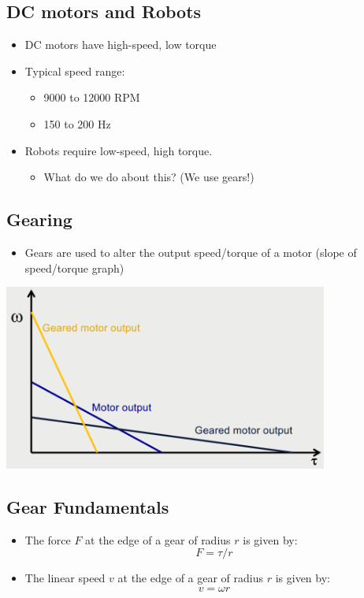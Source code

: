 \documentclass[10pt]{article}
\begin{document}
\subsection*{DC motors and Robots}
\begin{itemize}
	\item DC motors have high-speed, low torque
	\item Typical speed range:
	\begin{itemize}
        \item 9000 to 12000 RPM
        \item 150 to 200 Hz
    \end{itemize}
    \item Robots require low-speed, high torque.  
    \begin{itemize}
        \item What do we do about this? (We use gears!)
    \end{itemize}
\end{itemize}

\subsection*{Gearing}
\begin{itemize}
	\item Gears are used to alter the output speed/torque of a motor (slope of speed/torque graph)
\end{itemize}
\begin{center} 
	\includegraphics*[width=0.8\textwidth]{L2_13.png} 
\end{center}

\subsection*{Gear Fundamentals}
\begin{itemize}
	\item The force $F$ at the edge of a gear of radius $r$ is given by:
	\[F = \tau / r\]
    \item The linear speed $v$ at the edge of a gear of radius $r$ is given by:
    \[v = \omega r\]
\end{itemize}
\end{document}
